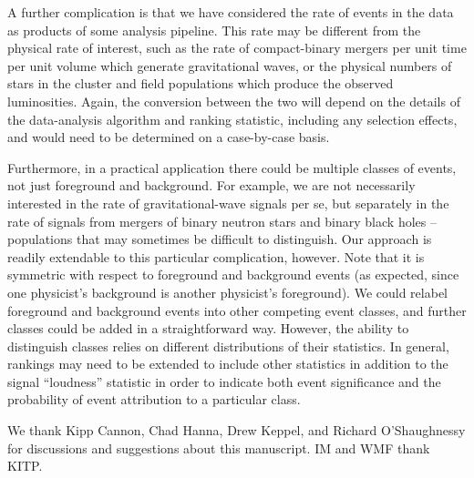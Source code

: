 \documentclass[aps,prd]{revtex4-1}
\begin{document}
A further complication is that we have considered the rate of events
in the data as products of some analysis pipeline.  This rate may be
different from the physical rate of interest, such as the rate of
compact-binary mergers per unit time per unit volume which generate
gravitational waves, or the physical numbers of stars in the cluster
and field populations which produce the observed luminosities.  Again,
the conversion between the two will depend on the details of the
data-analysis algorithm and ranking statistic, including any selection
effects, and would need to be determined on a case-by-case basis.

Furthermore, in a practical application there could be multiple
classes of events, not just foreground and background.  For example,
we are not necessarily interested in the rate of gravitational-wave
signals per se, but separately in the rate of signals from mergers of
binary neutron stars and binary black holes -- populations that may
sometimes be difficult to distinguish.  Our approach is readily
extendable to this particular complication, however.  Note that it is
symmetric with respect to foreground and background events (as
expected, since one physicist's background is another physicist's
foreground).  We could relabel foreground and background events into
other competing event classes, and further classes could be added in a
straightforward way.  However, the ability to distinguish classes
relies on different distributions of their statistics.  In general,
rankings may need to be extended to include other statistics in
addition to the signal ``loudness'' statistic in order to indicate
both event significance and the probability of event attribution to a
particular class.

\begin{acknowledgments}
  We thank Kipp Cannon, Chad Hanna, Drew Keppel, and Richard
  O'Shaughnessy for discussions and suggestions about this manuscript.
  IM and WMF thank KITP.
\end{acknowledgments}

 
\end{document}
